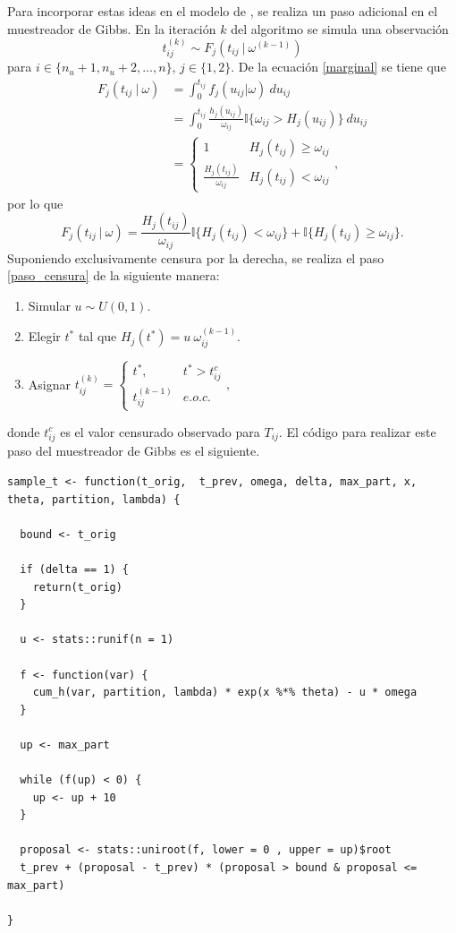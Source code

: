 \documentclass[11pt,a4paper]{article}
\begin{document}
Para incorporar estas ideas en el modelo de \citet{nieto}, se realiza un paso adicional en el muestreador de Gibbs. En la iteración $k$ del algoritmo se simula una observación
\begin{equation} \label{paso_censura}
t_{ij}^{(k)} \sim F_j(t_{ij} \ | \  \omega^{(k-1)})
\end{equation}
para $ i \in \lbrace n_u+1, n_u + 2, \dots, n \rbrace$, $j \in \lbrace 1, 2 \rbrace.$ De la ecuación \eqref{marginal} se tiene que
\begin{align*}
F_j(t_{ij} \ | \ \omega) &= \int_0^{t_{ij}} f_j(u_{ij}|\omega) \ du_{ij}\\
&= \int_0^{t_{ij}} \frac{h_j(u_{ij})}{\omega_{ij}} \mathbb{I}\lbrace \omega_{ij} > H_j(u_{ij}) \rbrace \ du_{ij}\\
&= \begin{cases} 
      1 & H_j(t_{ij}) \geq \omega_{ij}\\
      \frac{H_j(t_{ij})}{\omega_{ij}} & H_j(t_{ij}) < \omega_{ij}
   \end{cases},
\end{align*}
por lo que $$F_j(t_{ij} \ | \ \omega) = \frac{H_j(t_{ij})}{\omega_{ij}} \mathbb{I} \lbrace H_j(t_{ij}) < \omega_{ij} \rbrace + \mathbb{I}\lbrace H_j(t_{ij}) \geq \omega_{ij} \rbrace.$$ Suponiendo exclusivamente censura por la derecha, se realiza el paso \eqref{paso_censura} de la siguiente manera:
\begin{enumerate}
\item Simular $u\sim U(0,1)$.
\item Elegir $t^*$ tal que $H_j(t^*) = u \ \omega_{ij}^{(k-1)}.$
\item Asignar $t_{ij}^{(k)} = 
\begin{cases}
t^*, & t^* > t_{ij}^c\\
t_{ij}^{(k-1)} & e.o.c.
\end{cases},$
\end{enumerate}
donde $t_{ij}^c$ es el valor censurado observado para $T_{ij}$. El código para realizar este paso del muestreador de Gibbs es el siguiente.\\

\begin{lstlisting}
sample_t <- function(t_orig,  t_prev, omega, delta, max_part, x, theta, partition, lambda) {

  bound <- t_orig

  if (delta == 1) {
    return(t_orig)
  }

  u <- stats::runif(n = 1)

  f <- function(var) {
    cum_h(var, partition, lambda) * exp(x %*% theta) - u * omega
  }

  up <- max_part

  while (f(up) < 0) {
    up <- up + 10
  }

  proposal <- stats::uniroot(f, lower = 0 , upper = up)$root
  t_prev + (proposal - t_prev) * (proposal > bound & proposal <= max_part)

}
\end{lstlisting}\leavevmode\newline
\end{document}
